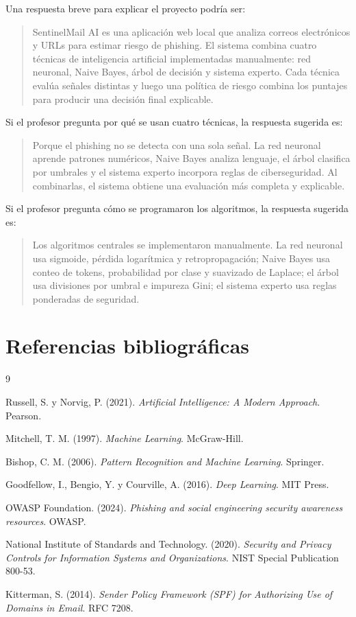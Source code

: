 \documentclass[12pt,letterpaper]{article}
\begin{document}
Una respuesta breve para explicar el proyecto podría ser:

\begin{quote}
SentinelMail AI es una aplicación web local que analiza correos electrónicos y URLs para estimar riesgo de phishing. El sistema combina cuatro técnicas de inteligencia artificial implementadas manualmente: red neuronal, Naive Bayes, árbol de decisión y sistema experto. Cada técnica evalúa señales distintas y luego una política de riesgo combina los puntajes para producir una decisión final explicable.
\end{quote}

Si el profesor pregunta por qué se usan cuatro técnicas, la respuesta sugerida es:

\begin{quote}
Porque el phishing no se detecta con una sola señal. La red neuronal aprende patrones numéricos, Naive Bayes analiza lenguaje, el árbol clasifica por umbrales y el sistema experto incorpora reglas de ciberseguridad. Al combinarlas, el sistema obtiene una evaluación más completa y explicable.
\end{quote}

Si el profesor pregunta cómo se programaron los algoritmos, la respuesta sugerida es:

\begin{quote}
Los algoritmos centrales se implementaron manualmente. La red neuronal usa sigmoide, pérdida logarítmica y retropropagación; Naive Bayes usa conteo de tokens, probabilidad por clase y suavizado de Laplace; el árbol usa divisiones por umbral e impureza Gini; el sistema experto usa reglas ponderadas de seguridad.
\end{quote}

\section{Referencias bibliográficas}

\begin{thebibliography}{9}

Russell, S. y Norvig, P. (2021). \textit{Artificial Intelligence: A Modern Approach}. Pearson.

Mitchell, T. M. (1997). \textit{Machine Learning}. McGraw-Hill.

Bishop, C. M. (2006). \textit{Pattern Recognition and Machine Learning}. Springer.

Goodfellow, I., Bengio, Y. y Courville, A. (2016). \textit{Deep Learning}. MIT Press.

OWASP Foundation. (2024). \textit{Phishing and social engineering security awareness resources}. OWASP.

National Institute of Standards and Technology. (2020). \textit{Security and Privacy Controls for Information Systems and Organizations}. NIST Special Publication 800-53.

Kitterman, S. (2014). \textit{Sender Policy Framework (SPF) for Authorizing Use of Domains in Email}. RFC 7208.

\end{thebibliography}
\end{document}
